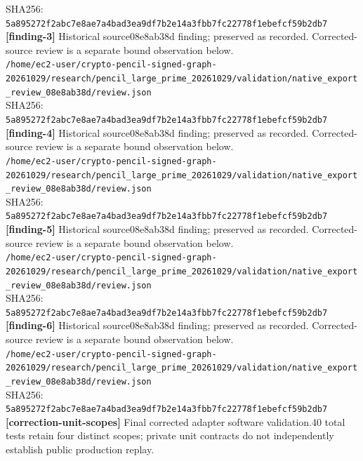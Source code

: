 \documentclass[11pt]{article}
\begin{document}
SHA256: \texttt{5a895272f2abc7e8ae7a4bad3ea9df7b2e14a3fbb7fc22778f1ebefcf59b2db7}\\
\textbf{[finding-3]} Historical source08e8ab38d finding; preserved as recorded. Corrected-source review is a separate bound observation below.\\
\texttt{/\allowbreak{}home/\allowbreak{}ec2-user/\allowbreak{}crypto-pencil-signed-graph-20261029/\allowbreak{}research/\allowbreak{}pencil\_large\_prime\_20261029/\allowbreak{}validation/\allowbreak{}native\_export\_review\_08e8ab38d/\allowbreak{}review.json}\\
SHA256: \texttt{5a895272f2abc7e8ae7a4bad3ea9df7b2e14a3fbb7fc22778f1ebefcf59b2db7}\\
\textbf{[finding-4]} Historical source08e8ab38d finding; preserved as recorded. Corrected-source review is a separate bound observation below.\\
\texttt{/\allowbreak{}home/\allowbreak{}ec2-user/\allowbreak{}crypto-pencil-signed-graph-20261029/\allowbreak{}research/\allowbreak{}pencil\_large\_prime\_20261029/\allowbreak{}validation/\allowbreak{}native\_export\_review\_08e8ab38d/\allowbreak{}review.json}\\
SHA256: \texttt{5a895272f2abc7e8ae7a4bad3ea9df7b2e14a3fbb7fc22778f1ebefcf59b2db7}\\
\textbf{[finding-5]} Historical source08e8ab38d finding; preserved as recorded. Corrected-source review is a separate bound observation below.\\
\texttt{/\allowbreak{}home/\allowbreak{}ec2-user/\allowbreak{}crypto-pencil-signed-graph-20261029/\allowbreak{}research/\allowbreak{}pencil\_large\_prime\_20261029/\allowbreak{}validation/\allowbreak{}native\_export\_review\_08e8ab38d/\allowbreak{}review.json}\\
SHA256: \texttt{5a895272f2abc7e8ae7a4bad3ea9df7b2e14a3fbb7fc22778f1ebefcf59b2db7}\\
\textbf{[finding-6]} Historical source08e8ab38d finding; preserved as recorded. Corrected-source review is a separate bound observation below.\\
\texttt{/\allowbreak{}home/\allowbreak{}ec2-user/\allowbreak{}crypto-pencil-signed-graph-20261029/\allowbreak{}research/\allowbreak{}pencil\_large\_prime\_20261029/\allowbreak{}validation/\allowbreak{}native\_export\_review\_08e8ab38d/\allowbreak{}review.json}\\
SHA256: \texttt{5a895272f2abc7e8ae7a4bad3ea9df7b2e14a3fbb7fc22778f1ebefcf59b2db7}\\
\textbf{[correction-unit-scopes]} Final corrected adapter software validation.40 total tests retain four distinct scopes; private unit contracts do not independently establish public production replay.\\
\end{document}
